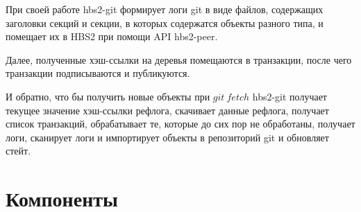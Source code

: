 \documentclass[11pt,a4paper]{article}
\begin{document}
При своей работе hbs2-git формирует логи git в виде файлов, содержащих заголовки секций
и секции, в которых содержатся объекты разного типа, и помещает их в HBS2 при помощи API hbs2-peer.

Далее, полученные хэш-ссылки на деревья помещаются в транзакции, после чего транзакции подписываются
и публикуются.

И обратно, что бы получить новые объекты при $git~fetch$  hbs2-git получает текущее значение
хэш-ссылки рефлога, скачивает данные рефлога, получает список транзакций, обрабатывает те, которые
до сих пор не обработаны, получает логи, сканирует логи и импортирует объекты в репозиторий git
и обновляет стейт.

\section{Компоненты}
\end{document}
